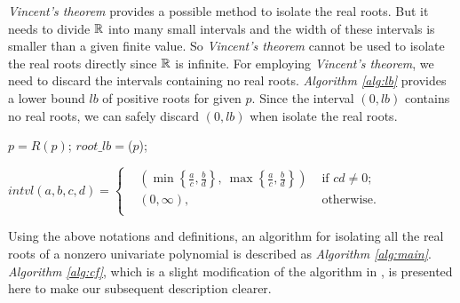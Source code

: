 {\em Vincent's theorem} provides  a possible method to isolate the real roots. But it needs to divide ${\mathbb R}$ into  many small intervals and the width of these intervals is smaller than a given  finite value. So {\em Vincent's theorem} cannot be used to isolate the real roots directly since ${\mathbb R}$ is infinite. For employing  {\em Vincent's theorem}, we need to discard the intervals containing no real roots. {\em Algorithm \ref{alg:lb}} provides a lower  bound $lb$ of positive roots for given $p$.  Since the interval  $(0,lb)$ contains no real roots,  we can safely  discard $(0,lb)$ when isolate the real roots.


\begin{algorithm}
\caption{\lb \label{alg:lb}}
\DontPrintSemicolon
{}
$p=R(p)$;\;
$root\_lb=$\up($p$); 
\end{algorithm}


\begin{definition}
$  intvl(a,b,c,d)=  \left\{\begin{aligned}
&  (\min\left\{ \frac{a}{c},\frac{b}{d} \right\},\ \max\left\{ \frac{a}{c},\frac{b}{d} \right\} ) &\text{ if } cd\neq0;\\
& (0,\infty), &\text{ otherwise}.\\
	\end{aligned}
	\right.
$
\end{definition}


Using the above notations and definitions, an algorithm for isolating all the real roots of a nonzero univariate polynomial is described as {\em Algorithm \ref{alg:main}}.
{\em Algorithm \ref{alg:cf}}, which is a slight modification of the algorithm in \cite{akr08}, is presented here to make our subsequent description clearer.

